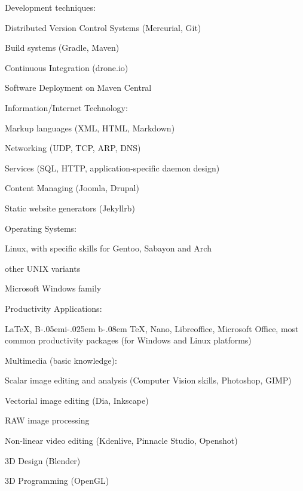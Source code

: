 \documentclass[10pt]{article}
\newenvironment{innerlist}[1][\enskip\textbullet]%
        {\begin{compactitem}[#1]}{\end{compactitem}}
\newcommand{\halfblankline}{\quad\vspace{-0.5\baselineskip}\pagebreak[3]}
\providecommand\BibTeX{{B\kern-.05em{\sc i\kern-.025em b}\kern-.08em
    \TeX}}
\begin{document}
Development techniques:
\begin{innerlist}
    \item Distributed Version Control Systems (Mercurial, Git)
    \item Build systems (Gradle, Maven)
    \item Continuous Integration (drone.io)
    \item Software Deployment on Maven Central
\end{innerlist}
\halfblankline

Information/Internet Technology:
\begin{innerlist}
    \item Markup languages (XML, HTML, Markdown)
    \item Networking (UDP, TCP, ARP, DNS)
    \item Services (SQL, HTTP, application-specific daemon design)
    \item Content Managing (Joomla, Drupal)
    \item Static website generators (Jekyllrb)
\end{innerlist}
\halfblankline

Operating Systems:
\begin{innerlist}
    \item Linux, with specific skills for Gentoo, Sabayon and Arch
    \item other UNIX variants
    \item Microsoft Windows family
\end{innerlist}
\halfblankline

Productivity Applications:
\begin{innerlist}
    \item \LaTeX{}, \BibTeX{}, Nano, Libreoffice, Microsoft Office, most common productivity packages (for Windows and Linux platforms)
\end{innerlist}
\halfblankline

Multimedia (basic knowledge):
\begin{innerlist}
    \item Scalar image editing and analysis (Computer Vision skills, Photoshop, GIMP)
    \item Vectorial image editing (Dia, Inkscape)
    \item RAW image processing
    \item Non-linear video editing (Kdenlive, Pinnacle Studio, Openshot)
    \item 3D Design (Blender)
    \item 3D Programming (OpenGL)
\end{innerlist}
\end{document}
